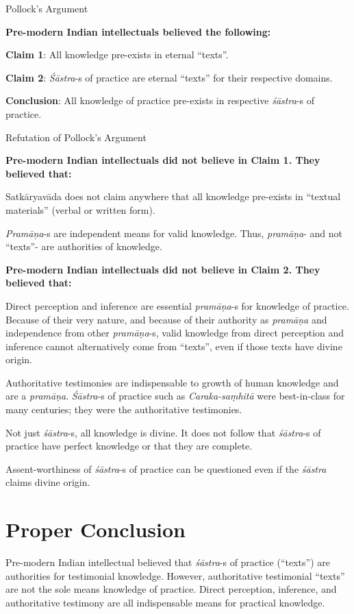 Pollock's Argument

{\bf Pre-modern Indian intellectuals believed the following:}

{\bf Claim 1}: All knowledge pre-exists in eternal ``texts''.  

{\bf Claim 2}: {\sl Śāstra}-s of practice are eternal ``texts'' for their respective domains.

{\bf Conclusion}:  All knowledge of practice pre-exists in respective {\sl śāstra}-s of practice. 

Refutation of Pollock's Argument

{\bf Pre-modern Indian intellectuals did not believe in Claim 1.  They believed that:}

Satkāryavāda does not claim anywhere that all knowledge pre-exists in ``textual materials'' (verbal or written form).

{\sl Pramāņa}-s are independent means for valid knowledge. Thus, {\sl pramāṇa}- and not ``texts''- are authorities of knowledge.

{\bf Pre-modern Indian intellectuals did not believe in Claim 2.  They believed that:}

Direct perception and inference are essential {\sl pramāṇa}-s for knowledge of practice.  Because of their very nature, and because of their authority as {\sl pramāṇa} and independence from other {\sl pramāṇa}-s, valid knowledge from direct perception and inference cannot alternatively come from ``texts'', even if those texts have divine origin.

Authoritative testimonies are indispensable to growth of human knowledge and are a {\sl pramāṇa}.  {\sl Śāstra}-s of practice such as {\sl Caraka-saṃhitā} were best-in-class for many centuries; they were the authoritative testimonies.

Not just {\sl śāstra}-s, all knowledge is divine. It does not follow that {\sl śāstra}-s of practice have perfect knowledge or that they are complete.

Assent-worthiness of {\sl śāstra}-s of practice can be questioned even if the {\sl śāstra} claims divine origin.

\section*{Proper Conclusion}

Pre-modern Indian intellectual believed that {\sl śāstra}-s of practice (``texts'') are authorities for testimonial knowledge. However, authoritative testimonial ``texts'' are not the sole means knowledge of practice. Direct perception, inference, and authoritative testimony are all indispensable means for practical knowledge.


